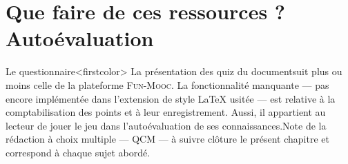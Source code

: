

\section[Que faire de ces ressources ? Quiz]{Que faire de ces ressources ? Autoévaluation}
\label{sec:V.6}

Le questionnaire\caution[t]<firstcolor>{%
La présentation des quiz du document\linebreak suit plus ou moins celle de la platefor\-me \textsc{Fun-Mooc}. La fonctionnalité manquante --- pas encore implémentée dans l'extension de style \LaTeX{} usitée --- est relative à la comptabilisation des points et à leur enregistrement. Aussi, il appartient au lecteur de jouer le jeu dans l'auto\-évaluation de ses connaissances.}{Note de la rédaction}
à choix multiple%
--- QCM --- à suivre clôture le présent chapitre  et correspond à chaque sujet abordé.
\parnotes

\vspace{6pt}

